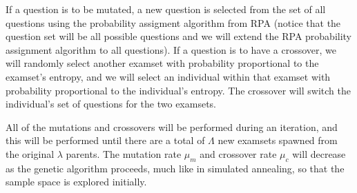 \documentclass[psamsfonts]{amsart}
\begin{document}
If a question is to be mutated, a new question is selected from the set of all questions using the probability assigment algorithm from RPA (notice that the question set will be all possible questions and we will extend the RPA probability assignment algorithm to all questions). If a question is to have a crossover, we will randomly select another examset with probability proportional to the examset's entropy, and we will select an individual within that examset with probability proportional to the individual's entropy. The crossover will switch the individual's set of questions for the two examsets. 

All of the mutations and crossovers will be performed during an iteration, and this will be performed until there are a total of $\Lambda$ new examsets spawned from the original $\lambda$ parents. The mutation rate $\mu_m$ and crossover rate $\mu_c$ will decrease as the genetic algorithm proceeds, much like in simulated annealing, so that the sample space is explored initially. 
\end{document}
